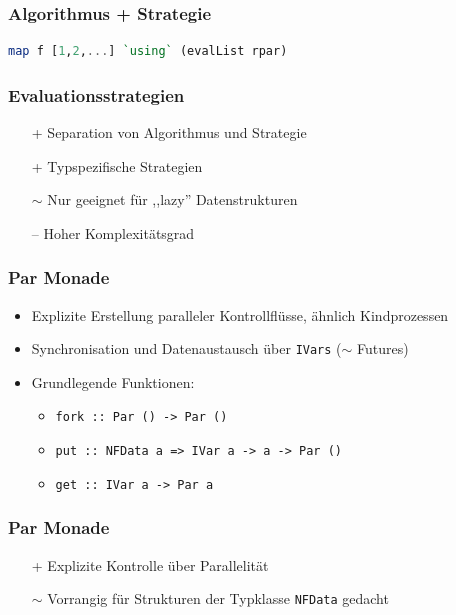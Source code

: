 \documentclass[presentation, shownotes]{beamer}
\begin{document}
\begin{frame}[fragile]
    \frametitle{Algorithmus + Strategie}
    \begin{lstlisting}[language=haskell,otherkeywords={using}]
    map f [1,2,...] `using` (evalList rpar)
    \end{lstlisting}
\end{frame}

\begin{frame}
\frametitle{Evaluationsstrategien}
    \begin{itemize}
        \item[+] Separation von Algorithmus und Strategie
        \item[+] Typspezifische Strategien
        \item[$\sim$] Nur geeignet für ,,lazy'' Datenstrukturen
        \item[--] Hoher Komplexitätsgrad
    \end{itemize}
\end{frame}

\begin{frame}
\frametitle{Par Monade}
    \begin{itemize}
    \item Explizite Erstellung paralleler Kontrollflüsse, ähnlich Kindprozessen
    \item Synchronisation und Datenaustausch über \texttt{IVars} ($\sim$ Futures)
    \item Grundlegende Funktionen:
        \begin{itemize}
            \item \texttt{fork :: Par () -> Par ()}
            \item \texttt{put  :: NFData a => IVar a -> a -> Par ()}
            \item \texttt{get  :: IVar a -> Par a}
        \end{itemize}
    \end{itemize}
\end{frame}

\begin{frame}
\frametitle{Par Monade}
    \begin{itemize}
        \item[+] Explizite Kontrolle über Parallelität
        \item[$\sim$] Vorrangig für Strukturen der Typklasse \texttt{NFData} gedacht
    \end{itemize}
\end{frame}
\end{document}

